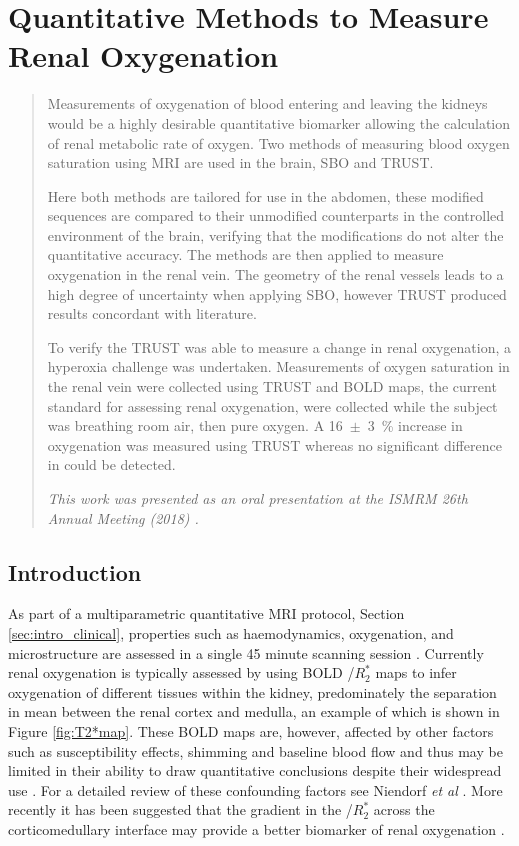\chapter{Quantitative Methods to Measure Renal Oxygenation}
\label{chap:TRUST}
\newpage
\begin{abstract}
	Measurements of oxygenation of blood entering and leaving the kidneys would be a highly desirable quantitative biomarker allowing the calculation of renal metabolic rate of oxygen. Two methods of measuring blood oxygen saturation using \acs{MRI} are used in the brain,  \ac{SBO} and \ac{TRUST}.
	
	Here both methods are tailored for use in the abdomen, these modified sequences are compared to their unmodified counterparts in the controlled environment of the brain, verifying that the modifications do not alter the quantitative accuracy. The methods are then applied to measure oxygenation in the renal vein. The geometry of the renal vessels leads to a high degree of uncertainty when applying \ac{SBO}, however \ac{TRUST} produced results concordant with literature.
	
	To verify the \ac{TRUST} was able to measure a change in renal oxygenation, a hyperoxia challenge was undertaken. Measurements of oxygen saturation in the renal vein were collected using \ac{TRUST} and \acs{BOLD} \ttwostar maps, the current standard for assessing renal oxygenation, were collected while the subject was breathing room air, then pure oxygen. A 16~$\pm$~3~\% increase in oxygenation was measured using \ac{TRUST} whereas no significant difference in \ttwostar could be detected. 
	
	\textit{This work was presented as an oral presentation at the \ac{ISMRM} 26th Annual Meeting (2018) \cite{daniel_applying_2018}.}
	
\end{abstract}
\newpage
\acresetall

\section{Introduction}
As part of a multiparametric quantitative \ac{MRI} protocol, Section \ref{sec:intro_clinical}, properties such as haemodynamics, oxygenation, and microstructure are assessed in a single 45 minute scanning session \cite{cox_multiparametric_2017, buchanan_quantitative_2019}. Currently renal oxygenation is typically assessed by using \ac{BOLD} \ttwostar/$R_2^*$ maps to infer oxygenation of different tissues within the kidney, predominately the separation in mean \ttwostar between the renal cortex and medulla, an example of which is shown in Figure \ref{fig:T2*map}. These \ac{BOLD} \ttwostar maps are, however, affected by other factors such as susceptibility effects, shimming and baseline blood flow and thus may be limited in their ability to draw quantitative conclusions despite their widespread use \cite{pruijm_blood_2017}. For a detailed review of these confounding factors see Niendorf \textit{et al} \cite{niendorf_how_2014}. More recently it has been suggested that the gradient in the \ttwostar/$R_2^*$ across the corticomedullary interface may provide a better biomarker of renal oxygenation \cite{milani_reduction_2017, pruijm_blood_2017}.

